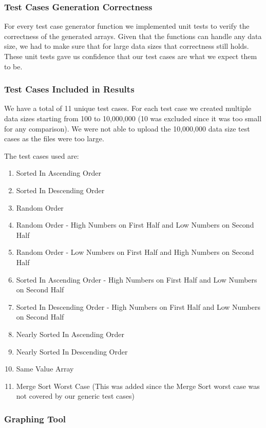 \subsubsection{Test Cases Generation Correctness}
For every test case generator function we implemented unit tests to verify the correctness of the generated arrays. Given that the functions can handle any data size, we had to make sure that for large data sizes that correctness still holds. These unit tests gave us confidence that our test cases are what we expect them to be.

\subsubsection{Test Cases Included in Results}
We have a total of 11 unique test cases. For each test case we created multiple data sizes starting from 100 to 10,000,000 (10 was excluded since it was too small for any comparison). We were not able to upload the 10,000,000 data size test cases as the files were too large.

The test cases used are:
\begin{enumerate}
    \item Sorted In Ascending Order
    \item Sorted In Descending Order  
    \item Random Order  
    \item Random Order - High Numbers on First Half and Low Numbers on Second Half  
    \item Random Order - Low Numbers on First Half and High Numbers on Second Half  
    \item Sorted In Ascending Order - High Numbers on First Half and Low Numbers on Second Half 
    \item Sorted In Descending Order - High Numbers on First Half and Low Numbers on Second Half 
    \item Nearly Sorted In Ascending Order
    \item Nearly Sorted In Descending Order
    \item Same Value Array
    \item Merge Sort Worst Case (This was added since the Merge Sort worst case was not covered by our generic test cases)
    
\end{enumerate}

\subsubsection{Graphing Tool}

